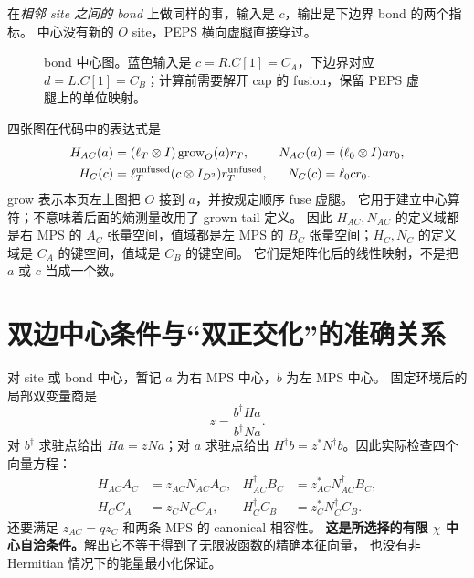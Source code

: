 \documentclass[11pt]{article}
\begin{document}
在\emph{相邻 site 之间的 bond} 上做同样的事，输入是 $c$，输出是下边界 bond 的两个指标。
中心没有新的 $O$ site，PEPS 横向虚腿直接穿过。
\begin{figure}[h]\centering
{}
\caption{bond 中心图。蓝色输入是 $c=R.C[1]=C_A$，下边界对应 $d=L.C[1]=C_B$；计算前需要解开 cap 的 fusion，保留 PEPS 虚腿上的单位映射。}
\end{figure}

四张图在代码中的表达式是
\begin{align*}
H_{AC}(a)&=(\ell_T\otimes I)\operatorname{grow}_O(a)r_T,&N_{AC}(a)&=(\ell_0\otimes I)a r_0,\\
H_C(c)&=\ell_T^{\rm unfused}(c\otimes I_{D^2})r_T^{\rm unfused},&N_C(c)&=\ell_0c r_0.
\end{align*}
grow 表示本页左上图把 $O$ 接到 $a$，并按规定顺序 fuse 虚腿。
它用于建立中心算符；不意味着后面的熵测量改用了 grown-tail 定义。
因此 $H_{AC},N_{AC}$ 的定义域都是右 MPS 的 $A_C$ 张量空间，值域都是左 MPS 的
$B_C$ 张量空间；$H_C,N_C$ 的定义域是 $C_A$ 的键空间，值域是 $C_B$ 的键空间。
它们是矩阵化后的线性映射，不是把 $a$ 或 $c$ 当成一个数。
\clearpage

\section{双边中心条件与“双正交化”的准确关系}
对 site 或 bond 中心，暂记 $a$ 为右 MPS 中心，$b$ 为左 MPS 中心。
固定环境后的局部双变量商是
\[
z=\frac{b^\dagger Ha}{b^\dagger Na}.
\]
对 $b^\dagger$ 求驻点给出 $Ha=zNa$；对 $a$ 求驻点给出
$H^\dagger b=z^*N^\dagger b$。因此实际检查四个向量方程：
\begin{align}
H_{AC}A_C&=z_{AC}N_{AC}A_C,&H_{AC}^\dagger B_C&=z_{AC}^*N_{AC}^\dagger B_C,\\
H_CC_A&=z_CN_CC_A,&H_C^\dagger C_B&=z_C^*N_C^\dagger C_B.
\end{align}
还要满足 $z_{AC}=qz_C$ 和两条 MPS 的 canonical 相容性。
\textbf{这是所选择的有限 $\chi$ 中心自洽条件。}解出它不等于得到了无限波函数的精确本征向量，
也没有非 Hermitian 情况下的能量最小化保证。
\end{document}
